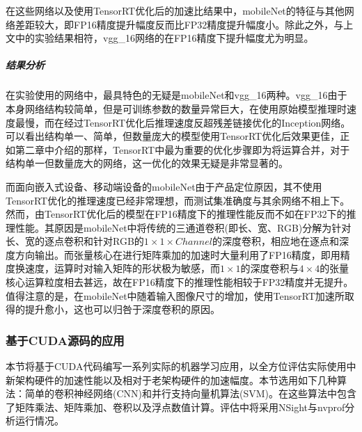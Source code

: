 \par 在这些网络以及使用TensorRT优化后的加速比结果中，mobileNet的特征与其他网络差距较大，即FP16精度提升幅度反而比FP32精度提升幅度小。除此之外，与上文中的实验结果相符，vgg\_16网络的在FP16精度下提升幅度尤为明显。
\subparagraph{结果分析}
\par 在实验使用的网络中，最具特色的无疑是mobileNet和vgg\_16两种。vgg\_16由于本身网络结构较简单，但是可训练参数的数量异常巨大，在使用原始模型推理时速度最慢，而在经过TensorRT优化后推理速度反超残差链接优化的Inception网络。可以看出结构单一、简单，但数量庞大的模型使用TensorRT优化后效果更佳，正如第二章中介绍的那样，TensorRT中最为重要的优化步骤即为将运算合并，对于结构单一但数量庞大的网络，这一优化的效果无疑是非常显著的。
\par 而面向嵌入式设备、移动端设备的mobileNet由于产品定位原因，其不使用TensorRT优化的推理速度已经非常理想，而测试集准确度与其余网络不相上下。然而，由TensorRT优化后的模型在FP16精度下的推理性能反而不如在FP32下的推理性能。其原因是mobileNet中将传统的三通道卷积(即长、宽、RGB)分解为针对长、宽的逐点卷积和针对RGB的$ 1\times 1\times Channel $的深度卷积，相应地在逐点和深度方向输出。而张量核心在进行矩阵乘加的加速时大量利用了FP16精度，即用精度换速度，运算时对输入矩阵的形状极为敏感，而$ 1\times 1 $的深度卷积与$ 4 \times 4 $的张量核心运算粒度相去甚远，故在FP16精度下的推理性能相较于FP32精度并无提升。值得注意的是，在mobileNet中随着输入图像尺寸的增加，使用TensorRT加速所取得的提升愈小，这也可以归咎于深度卷积的原因。
\subsubsection{基于CUDA源码的应用}
\par 本节将基于CUDA代码编写一系列实际的机器学习应用，以全方位评估实际使用中新架构硬件的加速性能以及相对于老架构硬件的加速幅度。本节选用如下几种算法：简单的卷积神经网络(CNN)和并行支持向量机算法(SVM)。在这些算法中包含了矩阵乘法、矩阵乘加、卷积以及浮点数值计算。评估中将采用NSight与nvprof分析运行情况。
